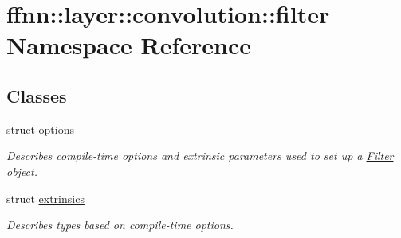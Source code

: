 \hypertarget{namespaceffnn_1_1layer_1_1convolution_1_1filter}{\section{ffnn\-:\-:layer\-:\-:convolution\-:\-:filter Namespace Reference}
\label{namespaceffnn_1_1layer_1_1convolution_1_1filter}
}
\subsection*{Classes}
\begin{DoxyCompactItemize}
\item 
struct \hyperlink{structffnn_1_1layer_1_1convolution_1_1filter_1_1options}{options}
\begin{DoxyCompactList}\small\item\em Describes compile-\/time options and extrinsic parameters used to set up a \hyperlink{structffnn_1_1layer_1_1convolution_1_1_filter}{Filter} object. \end{DoxyCompactList}\item 
struct \hyperlink{structffnn_1_1layer_1_1convolution_1_1filter_1_1extrinsics}{extrinsics}
\begin{DoxyCompactList}\small\item\em Describes types based on compile-\/time options. \end{DoxyCompactList}\end{DoxyCompactItemize}
